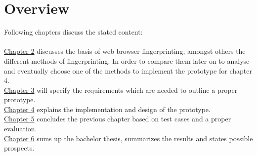 \section{Overview}
Following chapters discuss the stated content:\\\\
\hyperref[cha:foundation]{Chapter 2} discusses the basis of web browser fingerprinting, amongst others the different methods of fingerprinting. In order to compare them later on to analyse and eventually choose one of the methods to implement the prototype for chapter 4.\\
\hyperref[cha:requirements]{Chapter 3} will specify the requirements which are needed to outline a proper prototype.\\
\hyperref[cha:implementation]{Chapter 4} explains the implementation and design of the prototype.\\
\hyperref[cha:evaluation]{Chapter 5} concludes the previous chapter based on test cases and a proper evaluation.\\
\hyperref[cha:summary]{Chapter 6} sums up the bachelor thesis, summarizes the results and states possible prospects.




